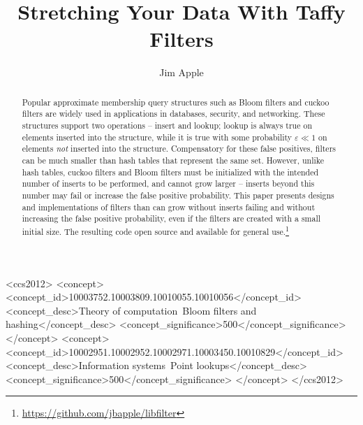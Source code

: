 \documentclass[sigconf, nonacm]{acmart}
\begin{document}
\title{Stretching Your Data With Taffy Filters}
\author{Jim Apple}

\begin{abstract}
\end{abstract}

\begin{CCSXML}
<ccs2012>
   <concept>
       <concept_id>10003752.10003809.10010055.10010056</concept_id>
       <concept_desc>Theory of computation~Bloom filters and hashing</concept_desc>
       <concept_significance>500</concept_significance>
   </concept>
   <concept>
       <concept_id>10002951.10002952.10002971.10003450.10010829</concept_id>
       <concept_desc>Information systems~Point lookups</concept_desc>
       <concept_significance>500</concept_significance>
   </concept>
 </ccs2012>
\end{CCSXML}





\begin{abstract}
Popular approximate membership query structures such as Bloom filters and cuckoo filters are widely used in applications in databases, security, and networking.
These structures support two operations -- insert and lookup; lookup is always true on elements inserted into the structure, while it is true with some probability $\varepsilon \ll 1$ on elements {\em not} inserted into the structure.
Compensatory for these false positives, filters can be much smaller than hash tables that represent the same set.
However, unlike hash tables, cuckoo filters and Bloom filters must be initialized with the intended number of inserts to be performed, and cannot grow larger --
inserts beyond this number may fail or increase the false positive probability.
This paper presents designs and implementations of filters than can grow without inserts failing and without increasing the false positive probability, even if the filters are created with a small initial size.
The resulting code open source and available for general use.\footnote{\url{https://github.com/jbapple/libfilter}}
\end{abstract}
\end{document}
